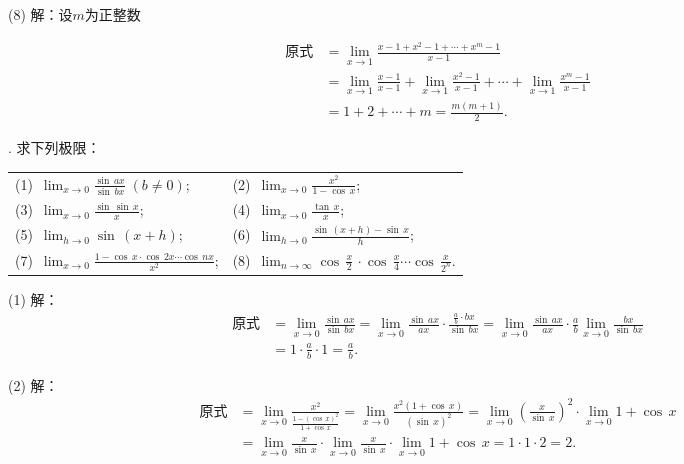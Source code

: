 \noindent (8) 解：设$m$为正整数

\begin{align}
    \text{原式} &= \lim_{x \to 1} \frac{x-1 + x^2-1 + \cdots + x^m - 1}{x-1} \\
    &= \lim_{x \to 1} \frac{x-1}{x-1} + \lim_{x \to 1} \frac{x^2-1}{x-1} + \cdots + \lim_{x \to 1} \frac{x^m-1}{x-1} \\
    &= 1 + 2 + \cdots + m = \frac{m(m+1)}{2}.
\end{align}

. 求下列极限：
\begin{table}[H]
    \centering
    \begin{tabularx}{\textwidth} {  >{\raggedright\arraybackslash}X >{\raggedright\arraybackslash}X  }
       (1)~$\displaystyle\lim_{x \to 0} \displaystyle\frac{\sin \, ax}{\sin \, bx} \; (b \neq 0)$; & (2)~$\displaystyle\lim_{x \to 0}\displaystyle\frac{x^2}{1-\cos \, x}$; \\ [1em]
       (3)~$\displaystyle\lim_{x \to 0} \frac{\sin \, \sin \, x}{x}$; & (4)~$\displaystyle\lim_{x \to 0} \displaystyle\frac{\tan \, x}{x}$; \\ [1em]
       (5)~$\displaystyle\lim_{h \to 0} \sin \, \left(x+h\right)$; & (6)~$\displaystyle\lim_{h \to 0} \displaystyle\frac{\sin \, \left(x+h\right)-\sin \, x}{h}$; \\ [1em] 
       (7)~$\displaystyle\lim_{x \to 0} \displaystyle\frac{1-\cos \, x \cdot \cos \, 2x \cdots \cos \, nx}{x^2}$; & (8)~$\displaystyle\lim_{n \to \infty} \cos \, \displaystyle\frac{x}{2} \, \cdot \cos \, \displaystyle\frac{x}{4} \cdots \cos \, \displaystyle\frac{x}{2^n}$.
      \end{tabularx}
\end{table}

\noindent (1) 解：
\begin{align}
    \text{原式} &= \lim_{x \to 0} \frac{\sin \, ax}{\sin \, bx} = \lim_{x \to 0} \frac{\sin \, ax}{ax} \cdot \frac{\displaystyle\frac{a}{b} \cdot bx}{\sin \, bx} = \lim_{x \to 0}\frac{\sin \, ax}{ax} \cdot \frac{a}{b} \lim_{x \to 0} \frac{bx}{\sin \, bx} \\
    &= 1 \cdot \frac{a}{b} \cdot 1 = \frac{a}{b}.
\end{align}

\noindent (2) 解：
\begin{align}
    \text{原式} &= \lim_{x \to 0} \frac{x^2}{\displaystyle\frac{1-(\cos \, x)^2}{1+\cos \, x}} = \lim_{x \to 0} \frac{x^2 (1+\cos \, x)}{(\sin \, x)^2} = \lim_{x \to 0} \left(\frac{x}{\sin \, x}\right)^2 \cdot \lim_{x \to 0} 1 + \cos \, x \\
    &= \lim_{x \to 0} \frac{x}{\sin \, x} \cdot \lim_{x \to 0} \frac{x}{\sin \, x} \cdot \lim_{x \to 0} 1+\cos \, x= 1 \cdot 1 \cdot 2 = 2.
\end{align}

